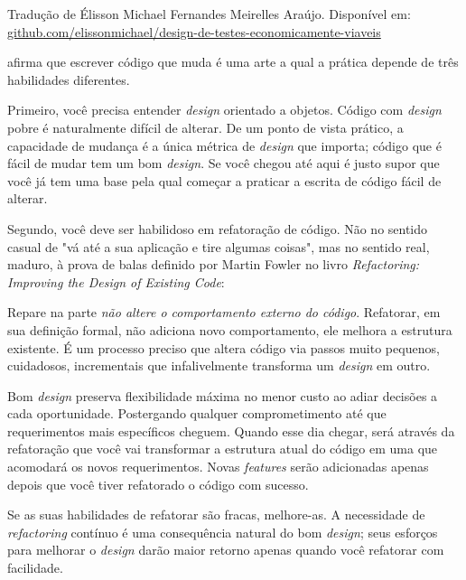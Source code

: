 
Tradução de Élisson Michael Fernandes Meirelles Araújo. Disponível em: \url{github.com/elissonmichael/design-de-testes-economicamente-viaveis}

\cite{Sandi} afirma que escrever código que muda é uma arte a qual a prática depende de três habilidades diferentes.

Primeiro, você precisa entender \textit{design} orientado a objetos. Código com \textit{design} pobre é naturalmente difícil de alterar. De um ponto de vista prático, a capacidade de mudança é a única métrica de \textit{design} que importa; código que é fácil de mudar tem um bom \textit{design}. Se você chegou até aqui é justo supor que você já tem uma base pela qual começar a praticar a escrita de código fácil de alterar.

Segundo, você deve ser habilidoso em refatoração de código. Não no sentido casual de "vá até a sua aplicação e tire algumas coisas", mas no sentido real, maduro, à prova de balas definido por Martin Fowler no livro \textit{Refactoring: Improving the Design of Existing Code}\cite{Fowler1999}:


Repare na parte \textit{não altere o comportamento externo do código}. Refatorar, em sua definição formal, não adiciona novo comportamento, ele melhora a estrutura existente. É um processo preciso que altera código via passos muito pequenos, cuidadosos, incrementais que infalivelmente transforma um \textit{design} em outro.

Bom \textit{design} preserva flexibilidade máxima no menor custo ao adiar decisões a cada oportunidade. Postergando qualquer comprometimento até que requerimentos mais específicos cheguem. Quando esse dia chegar, será através da refatoração que você vai transformar a estrutura atual do código em uma que acomodará os novos requerimentos. Novas \textit{features} serão adicionadas apenas depois que você tiver refatorado o código com sucesso.

Se as suas habilidades de refatorar são fracas, melhore-as. A necessidade de  \textit{refactoring} contínuo é uma consequência natural do bom \textit{design}; seus esforços para melhorar o \textit{design} darão maior retorno apenas quando você refatorar com facilidade.

